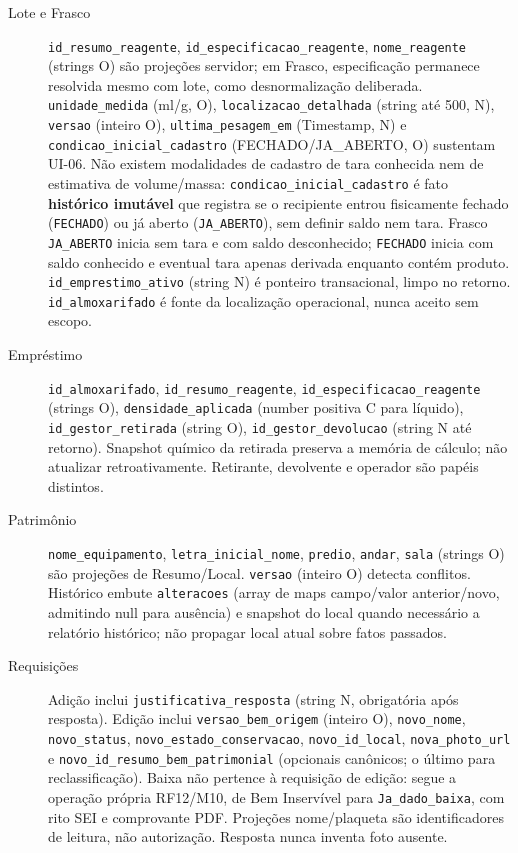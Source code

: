 \begin{description}
\item[Lote e Frasco] \texttt{id\_resumo\_reagente}, \texttt{id\_especificacao\_reagente}, \texttt{nome\_reagente} (strings O) são projeções servidor; em Frasco, especificação permanece resolvida mesmo com lote, como desnormalização deliberada. \texttt{unidade\_medida} (ml/g, O), \texttt{localizacao\_detalhada} (string até 500, N), \texttt{versao} (inteiro O), \texttt{ultima\_pesagem\_em} (Timestamp, N) e \texttt{condicao\_inicial\_cadastro} (FECHADO/JA\_ABERTO, O) sustentam UI-06. Não existem modalidades de cadastro de tara conhecida nem de estimativa de volume/massa: \texttt{condicao\_inicial\_cadastro} é fato \textbf{histórico imutável} que registra se o recipiente entrou fisicamente fechado (\texttt{FECHADO}) ou já aberto (\texttt{JA\_ABERTO}), sem definir saldo nem tara. Frasco \texttt{JA\_ABERTO} inicia sem tara e com saldo desconhecido; \texttt{FECHADO} inicia com saldo conhecido e eventual tara apenas derivada enquanto contém produto. \texttt{id\_emprestimo\_ativo} (string N) é ponteiro transacional, limpo no retorno. \texttt{id\_almoxarifado} é fonte da localização operacional, nunca aceito sem escopo.
\item[Empréstimo] \texttt{id\_almoxarifado}, \texttt{id\_resumo\_reagente}, \texttt{id\_especificacao\_reagente} (strings O), \texttt{densidade\_aplicada} (number positiva C para líquido), \texttt{id\_gestor\_retirada} (string O), \texttt{id\_gestor\_devolucao} (string N até retorno). Snapshot químico da retirada preserva a memória de cálculo; não atualizar retroativamente. Retirante, devolvente e operador são papéis distintos.
\item[Patrimônio] \texttt{nome\_equipamento}, \texttt{letra\_inicial\_nome}, \texttt{predio}, \texttt{andar}, \texttt{sala} (strings O) são projeções de Resumo/Local. \texttt{versao} (inteiro O) detecta conflitos. Histórico embute \texttt{alteracoes} (array de maps campo/valor anterior/novo, admitindo null para ausência) e snapshot do local quando necessário a relatório histórico; não propagar local atual sobre fatos passados.
\item[Requisições] Adição inclui \texttt{justificativa\_resposta} (string N, obrigatória após resposta). Edição inclui \texttt{versao\_bem\_origem} (inteiro O), \texttt{novo\_nome}, \texttt{novo\_status}, \texttt{novo\_estado\_conservacao}, \texttt{novo\_id\_local}, \texttt{nova\_photo\_url} e \texttt{novo\_id\_resumo\_bem\_patrimonial} (opcionais canônicos; o último para reclassificação). Baixa não pertence à requisição de edição: segue a operação própria RF12/M10, de Bem Inservível para \texttt{Ja\_dado\_baixa}, com rito SEI e comprovante PDF. Projeções nome/plaqueta são identificadores de leitura, não autorização. Resposta nunca inventa foto ausente.

\end{description}
